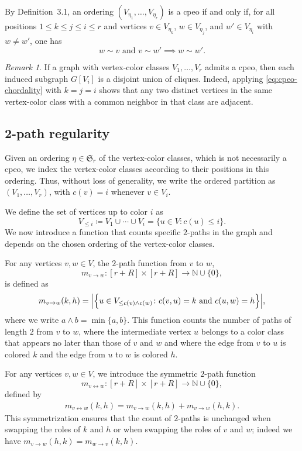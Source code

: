 \documentclass[12pt]{amsart}
\theoremstyle{plain}
\theoremstyle{definition}
\theoremstyle{remark}
\newtheorem{remark}[theorem]{Remark}
\newcommand{\1}{\mathbf{1}}
\begin{document}
By Definition~3.1, an ordering $(V_{\eta_1},\ldots,V_{\eta_r})$ is a cpeo if and only if, for all positions $1\le k\le j\le i\le r$ and vertices $v\in V_{\eta_k}$, $w\in V_{\eta_j}$, and $w'\in V_{\eta_i}$ with $w\ne w'$, one has
\begin{equation}\label{eq:cpeo-chordality}
w\sim v\mbox{ and }v\sim w'\implies w\sim w'.
\end{equation}

\begin{remark}\label{rem:cliques}
If a graph with vertex-color classes $V_1,\ldots,V_r$ admits a cpeo, then each induced subgraph $G[V_i]$ is a disjoint union of cliques. Indeed, applying \eqref{eq:cpeo-chordality} with $k=j=i$ shows that any two distinct vertices in the same vertex-color class with a common neighbor in that class are adjacent.
\end{remark}

\subsection{2-path regularity}\label{sec:2path}
Given an ordering $\eta\in\mathfrak{S}_r$ of the vertex-color classes, which is not
necessarily a cpeo, we index the vertex-color classes according to their positions
in this ordering. Thus, without loss of generality, we write the ordered partition
as $(V_1,\ldots,V_r)$, with $c(v)=i$ whenever $v\in V_i$.

We define the set of vertices up to color $i$ as
\[
V_{\leq i} \coloneq V_1 \cup \cdots \cup V_i
= \{u\in V\colon c(u)\leq i\}.
\]
We now introduce a function that counts specific $2$-paths in the graph and depends on the chosen ordering of the vertex-color classes.

For any vertices $v,w\in V$, the $2$-path function from $v$ to $w$, 
\[
m_{v\to w}\colon [r+R] \times [r+R] \to \mathbb{N}\cup\{0\},
\]
is defined as
\begin{align*}
m_{v\to w}(k, h) = \Bigl| \Big\{ u \in V_{\le c(v) \wedge c(w)} \colon c(v,u)=k\mbox{ and } c(u,w)=h\Big\} \Bigr|,
\end{align*}
where we write $a\wedge b = \min\{a,b\}$.
This function counts the number of paths of length $2$ from \(v\) to \(w\), where the intermediate vertex
$u$ belongs to a color class that appears no later than those of $v$ and $w$ and where the edge from \(v\) to $u$ is colored \(k\) and the edge from $u$ to \(w\) is colored \(h\). 

For any vertices $v,w\in V$, we introduce the symmetric $2$-path function 
\[
m_{v\leftrightarrow w}\colon [r+R]\times[r+R]\to \mathbb{N}\cup\{0\},
\]
defined by 
\begin{align*}
m_{v\leftrightarrow w}(k, h) = m_{v\to w}(k, h) + m_{v\to w}(h, k).
\end{align*}
This symmetrization ensures that the count of $2$-paths is unchanged when swapping the roles of $k$ and $h$ or when swapping the roles of $v$ and $w$; indeed we have $m_{v\to w}(h, k) = m_{w\to v}(k, h)$.
\end{document}
